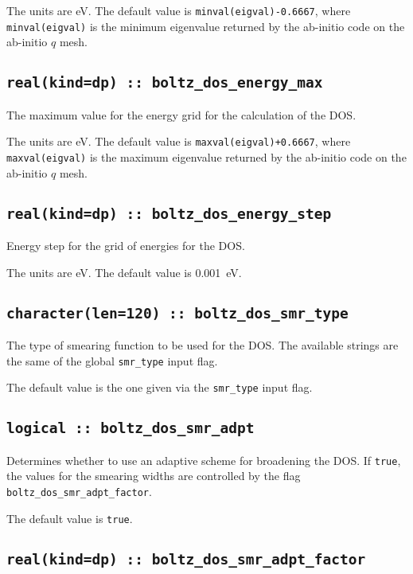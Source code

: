 The units are eV.
The default value is {\tt minval(eigval)-0.6667}, where  {\tt minval(eigval)} is the minimum eigenvalue returned by the ab-initio code on the ab-initio $q$ mesh.

\subsection[boltz\_dos\_energy\_max]{\tt real(kind=dp) :: boltz\_dos\_energy\_max}
The maximum value for the energy grid for the calculation of the DOS.

The units are eV.
The default value is {\tt maxval(eigval)+0.6667}, where  {\tt maxval(eigval)} is the maximum eigenvalue returned by the ab-initio code on the ab-initio $q$ mesh.

\subsection[boltz\_dos\_energy\_step]{\tt real(kind=dp) :: boltz\_dos\_energy\_step}
Energy step for the grid of energies for the DOS.

The units are eV.
The default value is 0.001~eV.

\subsection[boltz\_dos\_smr\_type]{\tt character(len=120) :: boltz\_dos\_smr\_type}
The type of smearing function to be used for the DOS. The available strings are the same of the global {\tt smr\_type} input flag. 

The default value is the one given via the {\tt smr\_type} input flag. 


\subsection[boltz\_dos\_smr\_adpt]{\tt logical :: boltz\_dos\_smr\_adpt}
Determines whether to use an adaptive scheme for broadening the
DOS. If \verb#true#, the values for the smearing widths are 
controlled by the flag {\tt boltz\_dos\_smr\_adpt\_factor}.

The default value is \verb#true#.



\subsection[boltz\_dos\_smr\_adaptive]{\tt real(kind=dp) :: boltz\_dos\_smr\_adpt\_factor}

